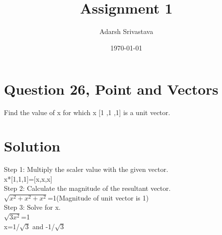 \documentclass[a4paper,12pt]{article}
\begin{document}
\title{Assignment 1}
\author{Adarsh Srivastava}
\date{\today}
\maketitle
\section{Question 26, Point and Vectors}
Find the value of x for which x [1 ,1 ,1] is a unit vector.
\section{Solution}
\vspace{2mm}Step 1: Multiply the scaler value with the given vector.\\ 
\vspace{2mm}x*[1,1,1]=[x,x,x]\\
\vspace{2mm}Step 2: Calculate the magnitude of the resultant vector.\\
\vspace{2mm}$\sqrt{x^2+x^2+x^2}$=1(Magnitude of unit vector is 1)\\
\vspace{2mm}Step 3: Solve for x.\\
\vspace{2mm}$\sqrt{3x^2}$=1\\
\vspace{2mm}x=1/$\sqrt{3}$ and -1/$\sqrt{3}$\\
\end{document}
